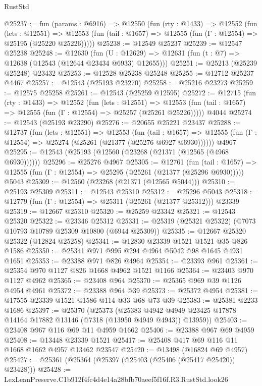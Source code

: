 \begin{lexlean}{RustStd}
\begin{coremodule}
@25237 := fun (params : @6916) =>
  @12550
    (fun (rty : @1433) =>
    @12552
      (fun (lets : @12551) =>
      @12553 (fun (tail : @1657) => @12555 (fun (Γ : @12554) => @25195 (@25220 @25226)))))
@25238 := @12549 @25237
@25239 := @12547 @25238
@25248 := @12630
    (fun (U : @12629) => @12631 (fun (t : @7) => @12638 (@12543 (@12644 @23434 @6933) @12655)))
@25251 := @25213 (@25239 @25248) @23432
@25253 := @12528 @25238 @25248
@25255 := @12712 @25237 @4467
@25257 := @12543 (@25193 @23270)
@25258 := @25216 @23273
@25259 := @12575 @25258
@25261 := @12543 (@25259 @12595)
@25272 := @12715
    (fun (rty : @1433) =>
    @12552
      (fun (lets : @12551) =>
      @12553 (fun (tail : @1657) => @12555 (fun (Γ : @12554) => @25257 (@25261 @25226)))))
    @4044
@25274 := @12543 (@25193 @23290)
@25276 := @20655 @25221 @23437
@25288 := @12737
    (fun (lets : @12551) =>
    @12553
      (fun (tail : @1657) =>
      @12555 (fun (Γ : @12554) => @25274 (@25261 (@21377 (@25276 @6927 @6930))))))
    @4967
@25295 := @12543 (@25193 (@12560 (@23268 (@21371 (@12565 (@4968 @6930))))))
@25296 := @25276 @4967
@25305 := @12761
    (fun (tail : @1657) => @12555 (fun (Γ : @12554) => @25295 (@25261 (@21377 (@25296 @6930)))))
    @5043
@25309 := @12560 (@23268 (@21371 (@12565 @5044)))
@25310 := @25193 @25309
@25311 := @12543 @25310
@25312 := @25296 @5043
@25318 := @12779 (fun (Γ : @12554) => @25311 (@25261 (@21377 @25312))) @23339
@25319 := @12667 @25310
@25320 := @25259 @23342
@25321 := @12543 @25320
@25322 := @23346 @25312
@25331 := @25319 (@25321 @25322) (@7073 @10793 @10789 @25309 @10800 (@6944 @25309))
@25335 := @12667 @25320 @25322 (@12824 @25258)
@25341 := @12830 @23339 @1521 @1521 @35 @826 @1586
@25350 := @25341 @971 @995 @294 @4964 @5042 @98 @1645 @4931 @1651
@25353 := @23388 @971 @826 @4964
@25354 := @23393 @961
@25361 := @25354 @970 @1127 @826 @1668 @4962 @1521 @1166
@25364 := @23403 @970 @1127 @4962
@25365 := @23408 @964
@25370 := @25365 @969 @39 @1126 @4954 @4961
@25372 := @23388 @964 @39
@25373 := @25372 @4954
@25381 := @17555 @23339 @1521 @1586 @114 @33 @68 @73 @39
@25383 := @25381 @2233 @1686
@25397 := @25370
    (@25373
      (@25383 @4942 @4949 @23425 @17878 @14164 @17882 @13146 (@7318 (@13950 @4949 @4943)) @13959))
@25403 := @23408 @967 @116 @69 @11 @4959 @1662
@25406 := @23388 @967 @69 @4959
@25408 := @13448 @23339 @1521
@25417 := @25408 @417 @69 @116 @11 @1668 @1662 @4957 @13462 @23547
@25420 := @13498 (@16824 @69 @4957)
@25427 := @25361 (@25364 (@25397 (@25403 (@25406 (@25417 @25420)) @23428)))
@25428 := LexLeanPreserve.C1b912f4fc4d4e14a28bfb70aeef5f16f.R3.RustStd.look26

\end{coremodule}
\end{lexlean}
